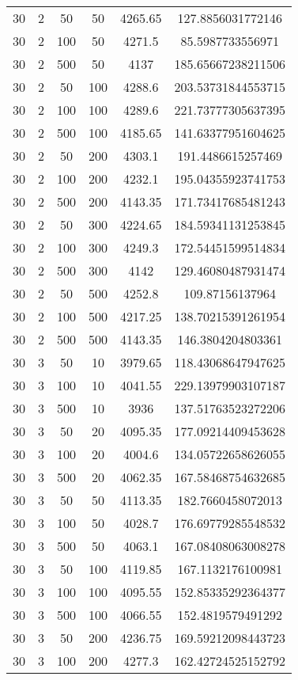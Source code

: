 {\begin{longtabu}{S
S
S
S
S[round-mode=places, round-precision=0]
S[round-mode=places, round-precision=0]}
30 & 2 & 50 & 50 & 4265.65 & 127.8856031772146 \\
30 & 2 & 100 & 50 & 4271.5 & 85.5987733556971 \\
30 & 2 & 500 & 50 & 4137 & 185.65667238211506 \\
30 & 2 & 50 & 100 & 4288.6 & 203.53731844553715 \\
30 & 2 & 100 & 100 & 4289.6 & 221.73777305637395 \\
30 & 2 & 500 & 100 & 4185.65 & 141.63377951604625 \\
30 & 2 & 50 & 200 & 4303.1 & 191.4486615257469 \\
30 & 2 & 100 & 200 & 4232.1 & 195.04355923741753 \\
30 & 2 & 500 & 200 & 4143.35 & 171.73417685481243 \\
30 & 2 & 50 & 300 & 4224.65 & 184.59341131253845 \\
30 & 2 & 100 & 300 & 4249.3 & 172.54451599514834 \\
30 & 2 & 500 & 300 & 4142 & 129.46080487931474 \\
30 & 2 & 50 & 500 & 4252.8 & 109.87156137964 \\
30 & 2 & 100 & 500 & 4217.25 & 138.70215391261954 \\
30 & 2 & 500 & 500 & 4143.35 & 146.3804204803361 \\
30 & 3 & 50 & 10 & 3979.65 & 118.43068647947625 \\
30 & 3 & 100 & 10 & 4041.55 & 229.13979903107187 \\
30 & 3 & 500 & 10 & 3936 & 137.51763523272206 \\
30 & 3 & 50 & 20 & 4095.35 & 177.09214409453628 \\
30 & 3 & 100 & 20 & 4004.6 & 134.05722658626055 \\
30 & 3 & 500 & 20 & 4062.35 & 167.58468754632685 \\
30 & 3 & 50 & 50 & 4113.35 & 182.7660458072013 \\
30 & 3 & 100 & 50 & 4028.7 & 176.69779285548532 \\
30 & 3 & 500 & 50 & 4063.1 & 167.08408063008278 \\
30 & 3 & 50 & 100 & 4119.85 & 167.1132176100981 \\
30 & 3 & 100 & 100 & 4095.55 & 152.85335292364377 \\
30 & 3 & 500 & 100 & 4066.55 & 152.4819579491292 \\
30 & 3 & 50 & 200 & 4236.75 & 169.59212098443723 \\
30 & 3 & 100 & 200 & 4277.3 & 162.42724525152792 \\

\end{longtabu}}
